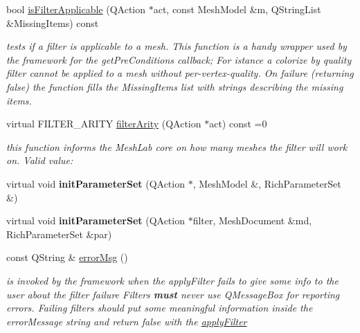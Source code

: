 \begin{DoxyCompactItemize}
\mbox{\label{class_mesh_filter_interface_a7fdfdfa72b404d328aec13df3d24a7f4}} 
bool \hyperlink{class_mesh_filter_interface_a7fdfdfa72b404d328aec13df3d24a7f4}{is\+Filter\+Applicable} (Q\+Action $\ast$act, const Mesh\+Model \&m, Q\+String\+List \&Missing\+Items) const
\begin{DoxyCompactList}\small\item\em tests if a filter is applicable to a mesh. This function is a handy wrapper used by the framework for the {\itshape get\+Pre\+Conditions} callback; For istance a colorize by quality filter cannot be applied to a mesh without per-\/vertex-\/quality. On failure (returning false) the function fills the Missing\+Items list with strings describing the missing items. \end{DoxyCompactList}\item 
virtual F\+I\+L\+T\+E\+R\+\_\+\+A\+R\+I\+TY \hyperlink{class_mesh_filter_interface_af948d1ad148015df1e32d347fd7ca802}{filter\+Arity} (Q\+Action $\ast$act) const =0
\begin{DoxyCompactList}\small\item\em this function informs the Mesh\+Lab core on how many meshes the filter will work on. Valid value\+: \end{DoxyCompactList}\item 
\mbox{\label{class_mesh_filter_interface_ab56a4f2c048146214df75bdd174edbcb}} 
virtual void {\bfseries init\+Parameter\+Set} (Q\+Action $\ast$, Mesh\+Model \&, Rich\+Parameter\+Set \&)
\item 
\mbox{\label{class_mesh_filter_interface_a59ae60e3b6a1391b0486c50417b0bc6f}} 
virtual void {\bfseries init\+Parameter\+Set} (Q\+Action $\ast$filter, Mesh\+Document \&md, Rich\+Parameter\+Set \&par)
\item 
\mbox{\label{class_mesh_filter_interface_aedd8f6d4430e3327cbddee552d4fbe4f}} 
const Q\+String \& \hyperlink{class_mesh_filter_interface_aedd8f6d4430e3327cbddee552d4fbe4f}{error\+Msg} ()
\begin{DoxyCompactList}\small\item\em is invoked by the framework when the apply\+Filter fails to give some info to the user about the filter failure Filters {\bfseries must} never use Q\+Message\+Box for reporting errors. Failing filters should put some meaningful information inside the error\+Message string and return false with the \hyperlink{class_mesh_filter_interface_ab97c75416be79ff1fa16333b362955cf}{apply\+Filter} \end{DoxyCompactList}\item 

\end{DoxyCompactItemize}
